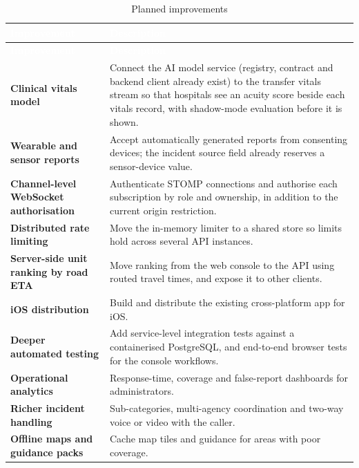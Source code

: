 {\tabfont\rowband
\begin{longtable}{@{}>{\raggedright\arraybackslash}p{}>{\raggedright\arraybackslash}p{}@{}}
\caption{Planned improvements}\label{tab:future-work}\\
\rowcolor{najdanavy}\textcolor{white}{\sffamily\bfseries\small Improvement} & \textcolor{white}{\sffamily\bfseries\small Description}\\
\endfirsthead
\rowcolor{najdanavy}\textcolor{white}{\sffamily\bfseries\small Improvement} & \textcolor{white}{\sffamily\bfseries\small Description}\\
\endhead
\bottomrule\endlastfoot
\textbf{Clinical vitals model} & Connect the AI model service (registry, contract and backend client already exist) to the transfer vitals stream so that hospitals see an acuity score beside each vitals record, with shadow-mode evaluation before it is shown.\\
\textbf{Wearable and sensor reports} & Accept automatically generated reports from consenting devices; the incident source field already reserves a sensor-device value.\\
\textbf{Channel-level WebSocket authorisation} & Authenticate STOMP connections and authorise each subscription by role and ownership, in addition to the current origin restriction.\\
\textbf{Distributed rate limiting} & Move the in-memory limiter to a shared store so limits hold across several API instances.\\
\textbf{Server-side unit ranking by road ETA} & Move ranking from the web console to the API using routed travel times, and expose it to other clients.\\
\textbf{iOS distribution} & Build and distribute the existing cross-platform app for iOS.\\
\textbf{Deeper automated testing} & Add service-level integration tests against a containerised PostgreSQL, and end-to-end browser tests for the console workflows.\\
\textbf{Operational analytics} & Response-time, coverage and false-report dashboards for administrators.\\
\textbf{Richer incident handling} & Sub-categories, multi-agency coordination and two-way voice or video with the caller.\\
\textbf{Offline maps and guidance packs} & Cache map tiles and guidance for areas with poor coverage.\\
\end{longtable}}
